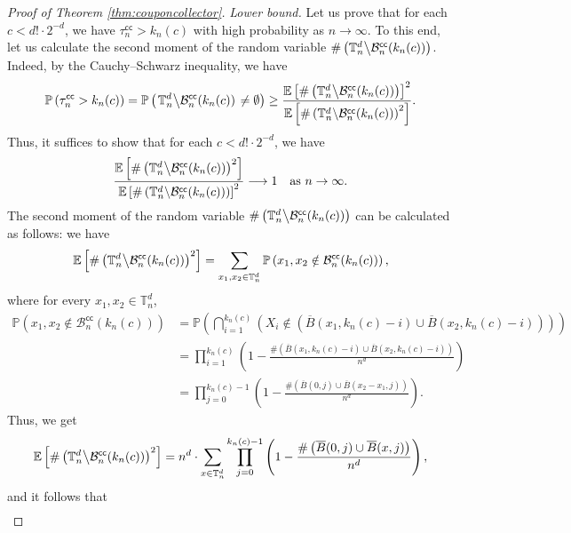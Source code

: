 \documentclass[10pt,a4paper]{amsart}
\theoremstyle{plain}
\theoremstyle{remark}
\begin{document}
\begin{proof}[Proof of Theorem \ref{thm:couponcollector}]
\medskip

\emph{Lower bound.}
Let us prove that for each $c<d!\cdot2^{-d}$, we have $\tau_n^\mathsf{cc}>k_n(c)$ with high probability as $n\to\infty$.
To this end, let us calculate the second moment of the random variable $\#\left(\mathbb{T}_n^d\middle\backslash\mathcal{B}_n^\mathsf{cc}(k_n(c))\right)$.
Indeed, by the Cauchy--Schwarz inequality, we have
\[\mathbb{P}\left(\tau_n^\mathsf{cc}>k_n(c)\right)=\mathbb{P}\left(\left.\mathbb{T}_n^d\middle\backslash\mathcal{B}_n^\mathsf{cc}(k_n(c))\right.\neq\emptyset\right)\geq\frac{\mathbb{E}\left[\#\left(\mathbb{T}_n^d\middle\backslash\mathcal{B}_n^\mathsf{cc}(k_n(c))\right)\right]^2}{\mathbb{E}\left[\#\left(\mathbb{T}_n^d\middle\backslash\mathcal{B}_n^\mathsf{cc}(k_n(c))\right)^2\right]}.\]
Thus, it suffices to show that for each $c<d!\cdot2^{-d}$, we have
\begin{equation}\label{eq:couponcollector2ndmomentgoal}
\frac{\mathbb{E}\left[\#\left(\mathbb{T}_n^d\middle\backslash\mathcal{B}_n^\mathsf{cc}(k_n(c))\right)^2\right]}{\mathbb{E}\left[\#\left(\mathbb{T}_n^d\middle\backslash\mathcal{B}_n^\mathsf{cc}(k_n(c))\right)\right]^2}\longrightarrow1\quad\text{as $n\to\infty$.}
\end{equation}
The second moment of the random variable $\#\left(\mathbb{T}_n^d\middle\backslash\mathcal{B}_n^\mathsf{cc}(k_n(c))\right)$ can be calculated as follows: we have
\[\mathbb{E}\left[\#\left(\mathbb{T}_n^d\middle\backslash\mathcal{B}_n^\mathsf{cc}(k_n(c))\right)^2\right]=\sum_{x_1,x_2\in\mathbb{T}_n^d}\mathbb{P}\left(x_1,x_2\notin\mathcal{B}_n^\mathsf{cc}(k_n(c))\right),\]
where for every $x_1,x_2\in\mathbb{T}_n^d$,
\[\begin{split}
\mathbb{P}\left(x_1,x_2\notin\mathcal{B}_n^\mathsf{cc}(k_n(c))\right)&=\mathbb{P}\left(\bigcap_{i=1}^{k_n(c)}\left(X_i\notin\left(\overline{B}(x_1,k_n(c)-i)\cup\overline{B}(x_2,k_n(c)-i)\right)\right)\right)\\
&=\prod_{i=1}^{k_n(c)}\left(1-\frac{\#\left(\overline{B}(x_1,k_n(c)-i)\cup\overline{B}(x_2,k_n(c)-i)\right)}{n^d}\right)\\
&=\prod_{j=0}^{k_n(c)-1}\left(1-\frac{\#\left(\overline{B}(0,j)\cup\overline{B}(x_2-x_1,j)\right)}{n^d}\right).
\end{split}\]
Thus, we get
\[\mathbb{E}\left[\#\left(\mathbb{T}_n^d\middle\backslash\mathcal{B}_n^\mathsf{cc}(k_n(c))\right)^2\right]=n^d\cdot\sum_{x\in\mathbb{T}_n^d}\prod_{j=0}^{k_n(c)-1}\left(1-\frac{\#\left(\overline{B}(0,j)\cup\overline{B}(x,j)\right)}{n^d}\right),\]
and it follows that
\begin{eqnarray*}

\end{eqnarray*}
\end{proof}
\end{document}
